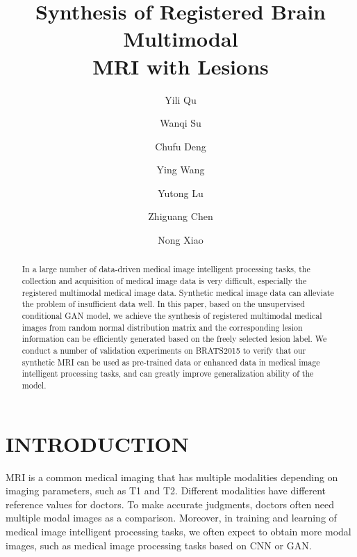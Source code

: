 \documentclass{ecai}
\begin{document}
\title{Synthesis of Registered Brain Multimodal\\
	MRI with Lesions}

\author{ Yili Qu \and Wanqi Su \and Chufu Deng \and Ying Wang \\
	\and Yutong Lu \and Zhiguang Chen \and Nong Xiao  }

\maketitle


\begin{abstract}
  In a large number of data-driven medical image intelligent processing tasks, the collection and acquisition of medical image data is very difficult, especially the registered multimodal medical image data. Synthetic medical image data can alleviate the problem of insufficient data well. In this paper, based on the unsupervised conditional GAN model, we achieve the synthesis of registered multimodal medical images from random normal distribution matrix and the corresponding lesion information can be efficiently generated based on the freely selected lesion label. We conduct a number of validation experiments on BRATS2015 to verify that our synthetic MRI can be used as pre-trained data or enhanced data in medical image intelligent processing tasks, and can greatly improve generalization ability of the model.
\end{abstract}

\section{INTRODUCTION}
%

MRI is a common medical imaging that has multiple modalities depending on imaging parameters, such as T1 and T2. Different modalities have different reference values for doctors. To make accurate judgments, doctors often need multiple modal images as a comparison. Moreover, in training and learning of medical image intelligent processing tasks, we often expect to obtain more modal images, such as medical image processing tasks based on CNN\cite{86krizhevsky2012imagenet} or GAN\cite{25goodfellow2014generative}. 
\end{document}
